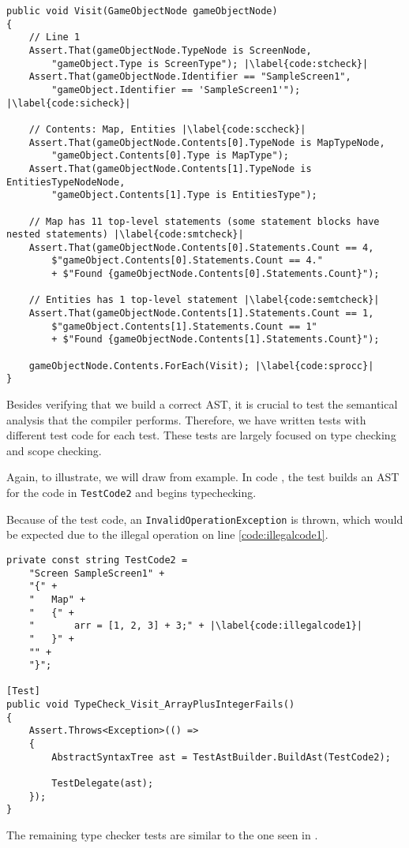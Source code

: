 \begin{lstlisting}[language=CSharp, caption={GameObject visitor code for testing the AST Builder}, label={lst:gameobjecttest},escapechar=|, language=CSharp]
public void Visit(GameObjectNode gameObjectNode)
{
    // Line 1
    Assert.That(gameObjectNode.TypeNode is ScreenNode,
        "gameObject.Type is ScreenType"); |\label{code:stcheck}|
    Assert.That(gameObjectNode.Identifier == "SampleScreen1", 
        "gameObject.Identifier == 'SampleScreen1'"); |\label{code:sicheck}|
    
    // Contents: Map, Entities |\label{code:sccheck}|
    Assert.That(gameObjectNode.Contents[0].TypeNode is MapTypeNode, 
        "gameObject.Contents[0].Type is MapType");
    Assert.That(gameObjectNode.Contents[1].TypeNode is EntitiesTypeNodeNode, 
        "gameObject.Contents[1].Type is EntitiesType");

    // Map has 11 top-level statements (some statement blocks have nested statements) |\label{code:smtcheck}|
    Assert.That(gameObjectNode.Contents[0].Statements.Count == 4, 
        $"gameObject.Contents[0].Statements.Count == 4." 
        + $"Found {gameObjectNode.Contents[0].Statements.Count}");
    
    // Entities has 1 top-level statement |\label{code:semtcheck}|
    Assert.That(gameObjectNode.Contents[1].Statements.Count == 1, 
        $"gameObject.Contents[1].Statements.Count == 1"
        + $"Found {gameObjectNode.Contents[1].Statements.Count}");
    
    gameObjectNode.Contents.ForEach(Visit); |\label{code:sprocc}|
}
\end{lstlisting}

Besides verifying that we build a correct AST, it is crucial to test the semantical analysis that the \dazel{} compiler performs. Therefore, we have written tests with different \dazel{} test code for each test. These tests are largely focused on type checking and scope checking.

Again, to illustrate, we will draw from example. In code , the test builds an AST for the code in \texttt{TestCode2} and begins typechecking.

Because of the test code, an \texttt{InvalidOperationException} is thrown, which would be expected due to the illegal operation on line \ref{code:illegalcode1}.

\begin{lstlisting}[language=CSharp, caption={Testing that arrays and integers cannot be added together}, label={lst:ArrayPlusIntegerFails}, language=CSharp, escapechar=|]
private const string TestCode2 =
    "Screen SampleScreen1" +
    "{" +
    "   Map" +
    "   {" +
    "       arr = [1, 2, 3] + 3;" + |\label{code:illegalcode1}|
    "   }" +
    "" +
    "}";

[Test]
public void TypeCheck_Visit_ArrayPlusIntegerFails()
{
    Assert.Throws<Exception>(() =>
    {
        AbstractSyntaxTree ast = TestAstBuilder.BuildAst(TestCode2);

        TestDelegate(ast);
    });
}
\end{lstlisting}

The remaining type checker tests are similar to the one seen in .
